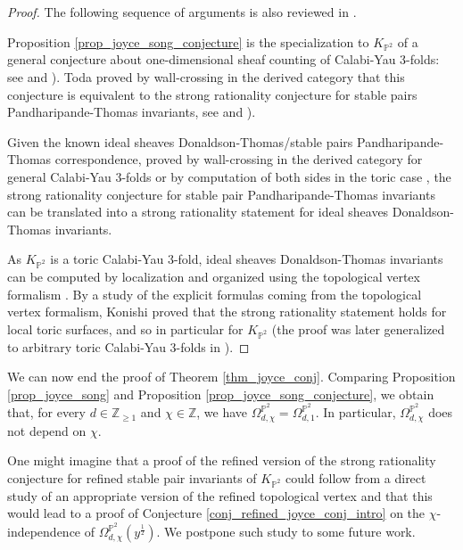 \documentclass[11pt,letterpaper]{amsart}
\newcommand\PP{\mathbb P}
\newcommand\Z{\mathbb Z}
\begin{document}
\begin{proof}
The following  sequence of arguments is also reviewed in \cite[Appendix A]{MR3861701}.

Proposition \ref{prop_joyce_song_conjecture} is the specialization to $K_{\PP^2}$ of a general conjecture about one-dimensional sheaf counting of Calabi-Yau 3-folds: see \cite[Conjecture 6.20]{MR2951762}
and \cite[Conjecture 6.3]{MR2892766}).
Toda
\cite[Theorem 6.4]{MR2892766} proved by wall-crossing in the derived category that this conjecture is equivalent to the strong rationality conjecture for stable pairs Pandharipande-Thomas invariants, see \cite[Conjecture 3.14]{MR2545686} and
\cite[Conjecture 6.2]{MR2892766}). 

Given the known ideal sheaves Donaldson-Thomas/stable pairs Pandharipande-Thomas correspondence, proved by wall-crossing in the derived category
for general Calabi-Yau 3-folds \cite{MR2813335} or by computation of both sides in the toric case \cite[\S 5]{MR2746343}, the strong rationality conjecture for stable pair Pandharipande-Thomas invariants can be translated into a strong rationality statement for ideal sheaves Donaldson-Thomas invariants.

As $K_{\PP^2}$ is a toric Calabi-Yau 3-fold, 
ideal sheaves Donaldson-Thomas invariants can be computed by localization and organized using the topological vertex formalism \cite{MR2264664}.
By a study of the explicit formulas coming from the topological vertex formalism, Konishi \cite[Theorem 1.3]{MR2215440}
proved that the strong rationality statement holds for local toric surfaces, 
and so in particular for $K_{\PP^2}$
(the proof was later generalized to arbitrary toric Calabi-Yau 3-folds in \cite{MR2250076}).
\end{proof}

We can now end the proof of
Theorem \ref{thm_joyce_conj}. Comparing  Proposition \ref{prop_joyce_song} and Proposition 
\ref{prop_joyce_song_conjecture}, we obtain that, for every $d \in \Z_{\geqslant 1}$ and
$\chi \in \Z$, we have $\Omega_{d,\chi}^{\PP^2}=\Omega_{d,1}^{\PP^2}$.
In particular, $\Omega_{d,\chi}^{\PP^2}$ does not depend on $\chi$.




One might imagine that a proof of the refined version of the strong rationality conjecture for refined stable pair invariants of $K_{\PP^2}$ could follow from a direct study of an appropriate version of the refined topological vertex and that this would lead to a proof of
Conjecture \ref{conj_refined_joyce_conj_intro} on the 
$\chi$-independence of $\Omega_{d,\chi}^{\PP^2}(y^{\frac{1}{2}})$. We postpone such study to some future work.
\end{document}
